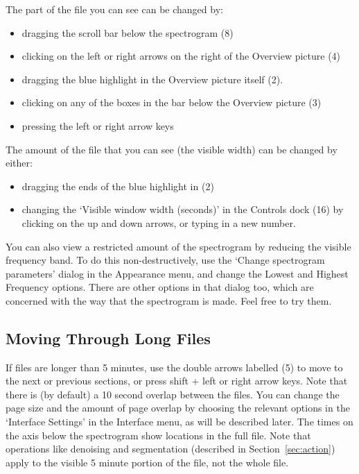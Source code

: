\documentclass{article}
\begin{document}
The part of the file you can see can be changed by:
	\begin{itemize}
	\item dragging the scroll bar below the spectrogram (8)
	\item clicking on the left or right arrows on the right of the Overview picture (4)
	\item dragging the blue highlight in the Overview picture itself (2). 
	\item clicking on any of the boxes in the bar below the Overview picture (3)
	\item pressing the left or right arrow keys
	\end{itemize}
The amount of the file that you can see (the visible width) can be changed by either: 
	\begin{itemize}
	\item dragging the ends of the blue highlight in (2)
	\item changing the `Visible window width (seconds)' in the Controls dock (16) by clicking on the up and down arrows, or typing in a new number.
	\end{itemize}

You can also view a restricted amount of the spectrogram by reducing the visible frequency band. To do this non-destructively, use the `Change spectrogram parameters' dialog in the Appearance menu, and change the Lowest and Highest Frequency options. There are other options in that dialog too, which are concerned with the way that the spectrogram is made. Feel free to try them. %

\subsection{Moving Through Long Files}

If files are longer than 5 minutes, use the double arrows labelled (5) to move to the next or previous sections, or press shift + left or right arrow keys. Note that there is (by default) a 10 second overlap between the files. You can change the page size and the amount of page overlap by choosing the relevant options in the `Interface Settings' in the Interface menu, as will be described later. The times on the axis below the spectrogram show locations in the full file. Note that operations like denoising and segmentation (described in Section~\ref{sec:action}) apply to the visible 5 minute portion of the file, not the whole file. 
\end{document}
